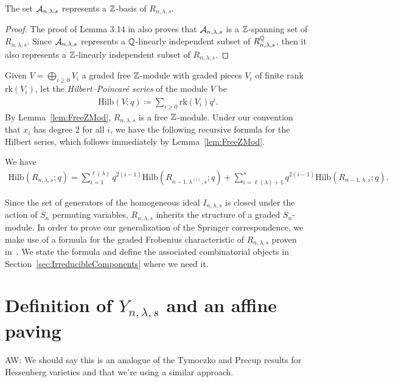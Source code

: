 \documentclass[12pt]{amsart}
\newcommand{\Hilb}{\mathrm{Hilb}}
\newcommand{\la}{\lambda}
\newcommand{\AW}[1]{{\color{green} AW: #1}}
\begin{document}
\begin{lemma}\label{lem:FreeZMod}
The set $\cA_{n,\la,s}$ represents a $\mathbb{Z}$-basis of $R_{n,\la,s}$.
\end{lemma}
\begin{proof}
The proof of Lemma 3.14 in \cite{GriffinOSP} also proves that $\cA_{n,\la,s}$ is a $\mathbb{Z}$-spanning set of $R_{n,\la,s}$. Since $\cA_{n,\la,s}$ represents a $\mathbb{Q}$-linearly independent subset of $R_{n,\la,s}^\bQ$, then it also represents a $\mathbb{Z}$-linearly independent subset of $R_{n,\la,s}$.
\end{proof}

Given $V = \bigoplus_{i\geq 0} V_i$ a graded free $\mathbb{Z}$-module with graded pieces $V_i$ of finite rank $\mathrm{rk}(V_i)$, let the \emph{Hilbert--Poincar\'e series} of the module $V$ be 
\begin{align}
    \Hilb(V;q) \coloneqq \sum_{i\geq 0} \mathrm{rk}(V_i)q^i.
\end{align}
By Lemma~\ref{lem:FreeZMod}, $R_{n,\la,s}$ is a free $\mathbb{Z}$-module. Under our convention that $x_i$ has degree $2$ for all $i$, we have the following recursive formula for the Hilbert series, which follows immediately by Lemma~\ref{lem:FreeZMod}.
\begin{lemma}\label{lem:RHilbRecursion}
We have
\begin{align}
    \Hilb(R_{n,\la,s};q) = \sum_{i=1}^{\ell(\la)} q^{2(i-1)} \Hilb(R_{n-1,\la^{(i)},s};q) + \sum_{i=\ell(\la)+1}^s q^{2(i-1)} \Hilb(R_{n-1,\la,s};q).
\end{align}
\end{lemma}

Since the set of generators of the homogeneous ideal $I_{n,\la,s}$ is closed under the action of $S_n$ permuting variables, $R_{n,\la,s}$ inherits the structure of a graded $S_n$-module. In order to prove our generalization of the Springer correspondence, we make use of a formula for the graded Frobenius characteristic of $R_{n,\la,s}$ proven in~\cite{GriffinOSP}. We state the formula and define the associated combinatorial objects in Section~\ref{sec:IrreducibleComponents} where we need it.




\section{Definition of $Y_{n,\lambda,s}$ and an affine paving}\label{sec:AffinePaving}

\AW{We should say this is an analogue of the Tymoczko and Precup results for Hessenberg varieties and that we're using a similar approach.}
\end{document}
